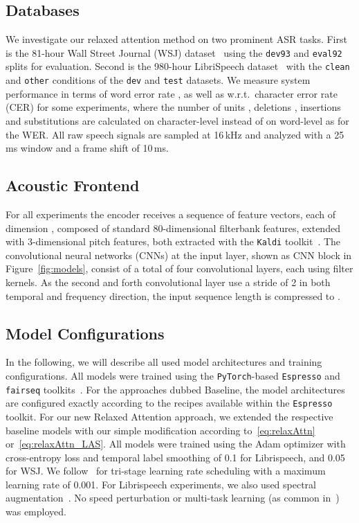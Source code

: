 \documentclass{article}
\def\espresso{\texttt{Espresso}\xspace}
\def\fairseq{\texttt{fairseq}\xspace}
\def\pytorch{\texttt{PyTorch}\xspace}
\begin{document}
\subsection{Databases}	\vspace{-2mm}
We investigate our relaxed attention method on two prominent ASR tasks. First is the 81-hour Wall Street Journal (WSJ) dataset~\cite{paul1992} using the \texttt{dev93} and \texttt{eval92} splits for evaluation. Second is the 980-hour LibriSpeech dataset~\cite{Panayotov2015} with the \texttt{clean} and \texttt{other} conditions of the \texttt{dev} and \texttt{test} datasets. We measure system performance in terms of word error rate , as well as w.r.t.\ character error rate (CER) for some experiments, where the number of units , deletions , insertions  and substitutions  are calculated on character-level instead of on word-level as for the WER. All raw speech signals are sampled at 16\,kHz and analyzed with a 25\,ms window and a frame shift of 10\,ms. 
\vspace{-2mm}
\subsection{Acoustic Frontend}\label{sec:frontend}\vspace{-2.5mm}
For all experiments the encoder receives a sequence  of  feature vectors, each of dimension , composed of standard 80-di\-men\-sion\-al filterbank features, extended with 3-dimensional pitch features, both extracted with the \texttt{Kaldi} toolkit~\cite{Povey2011}. The convolutional neural networks (CNNs) at the input layer, shown as CNN block in Figure~\ref{fig:models}, consist of a total of four convolutional layers, each using  filter kernels. As the second and forth convolutional layer use a stride of 2 in both temporal and frequency direction, the input sequence length is compressed to . 
\vspace{-2mm}
\subsection{Model Configurations}\vspace{-2mm}
In the following, we will describe all used model architectures and training configurations. All models were trained using the \pytorch-based \espresso and \fairseq tool\-kits~\cite{Paszke2019,ott2019,wang2019e}. For the approaches dubbed \textsf{Baseline}, the model architectures are configured exactly according to the recipes available within the \espresso toolkit. For our new \textsf{Relaxed Attention} approach, we extended the respective baseline models with our simple modification according to~\eqref{eq:relaxAttn} or~\eqref{eq:relaxAttn_LAS}. All models were trained using the Adam optimizer with cross-entropy loss and temporal label smoothing of 0.1 for Librispeech, and 0.05 for WSJ. We follow~\cite{Dong2018c} for tri-stage learning rate scheduling with a maximum learning rate of 0.001. For Librispeech experiments, we also used spectral augmentation~\cite{Park2019d}. No speed perturbation or multi-task learning (as common in~\cite{Karita2019b,Guo2021}) was employed.
\vspace{-2mm}
\end{document}
